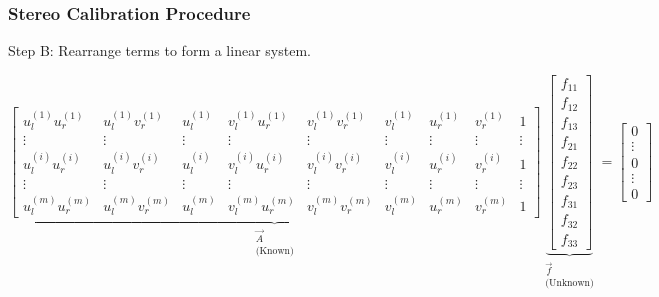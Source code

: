 \begin{frame}
    \frametitle{Stereo Calibration Procedure}
    
    Step B: Rearrange terms to form a linear system.

    \begin{equation*}
        \underbrace{
        \begin{bmatrix}
            u_l^{(1)}u_r^{(1)} & u_l^{(1)}v_r^{(1)} & u_l^{(1)} & v_l^{(1)}u_r^{(1)} & v_l^{(1)}v_r^{(1)} & v_l^{(1)} & u_r^{(1)} & v_r^{(1)} & 1\\
            \vdots & \vdots & \vdots & \vdots & \vdots & \vdots & \vdots & \vdots & \vdots\\
            u_l^{(i)}u_r^{(i)} & u_l^{(i)}v_r^{(i)} & u_l^{(i)} & v_l^{(i)}u_r^{(i)} & v_l^{(i)}v_r^{(i)} & v_l^{(i)} & u_r^{(i)} & v_r^{(i)} & 1\\
            \vdots & \vdots & \vdots & \vdots & \vdots & \vdots & \vdots & \vdots & \vdots\\
            u_l^{(m)}u_r^{(m)} & u_l^{(m)}v_r^{(m)} & u_l^{(m)} & v_l^{(m)}u_r^{(m)} & v_l^{(m)}v_r^{(m)} & v_l^{(m)} & u_r^{(m)} & v_r^{(m)} & 1
        \end{bmatrix}}_{\substack{\vec{A}\\ \text{(Known)}}}
        \underbrace{\begin{bmatrix}
            f_{11} \\ f_{12} \\ f_{13} \\ f_{21} \\ f_{22} \\ f_{23} \\ f_{31} \\ f_{32} \\ f_{33}
        \end{bmatrix}}_{\substack{\vec{f}\\ \text{(Unknown)}}}
        =
        \begin{bmatrix}
            0 \\ \vdots \\ 0 \\ \vdots \\ 0
        \end{bmatrix}
    \end{equation*}

    \begin{center}
    \end{center}
    
\end{frame}

